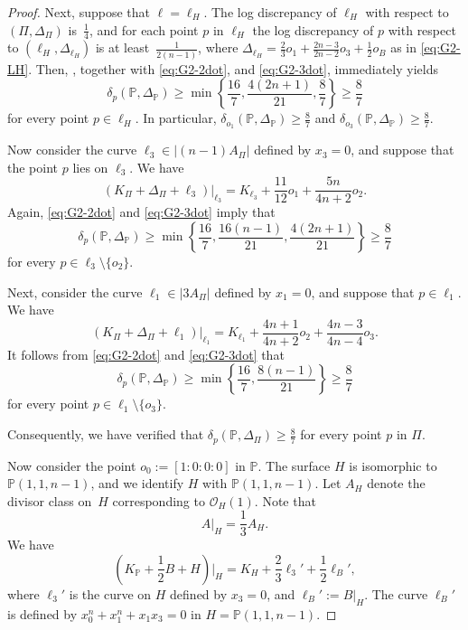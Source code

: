 \documentclass[10pt,a4paper]{amsart}
\begin{document}
\begin{proof}
Next, suppose that $\ell=\ell_H$. The log discrepancy of $\ell_H$ with respect to $(\Pi,\Delta_\Pi)$ is~$\frac{1}{4}$, and for each point $p$ in $\ell_H$ the log 
discrepancy of $p$ with respect to $(\ell_H,\Delta_{\ell_H})$ is at least~$\frac{1}{2(n-1)}$, where $\Delta_{\ell_H}=\frac{2}{3}o_1
+\frac{2n-3}{2n-2}o_3
+\frac{1}{2}o_B$ as in \eqref{eq:G2-LH}.
Then, \cite[Corollary~4.8]{Fu23}, together with \eqref{eq:G2-2dot}, and \eqref{eq:G2-3dot}, immediately yields
\[
\delta_{p}\left(\mathbb{P},\Delta_\mathbb{P}\right)
\ge
\min\left\{
\frac{16}{7},
\frac{4(2n+1)}{21},
\frac{8}{7}
\right\}
\ge
\frac{8}{7}
\]
for every point $p\in\ell_H$. In particular,  $\delta_{o_1}\left(\mathbb{P},\Delta_\mathbb{P}\right)\geq \frac{8}{7}$ and $ \delta_{o_3}\left(\mathbb{P},\Delta_\mathbb{P}\right)\geq \frac{8}{7}$.


Now consider the curve $\ell_3\in |(n-1)A_\Pi|$ defined by $x_3=0$, and suppose that the  point $p$ lies on $\ell_3$. We have
\[
\left(K_\Pi+\Delta_\Pi+\ell_3\right)\big|_{\ell_3}
=
K_{\ell_3}
+\frac{11}{12}o_1
+\frac{5n}{4n+2}o_2.
\]
Again, \eqref{eq:G2-2dot} and \eqref{eq:G2-3dot} imply that
\[
\delta_{p}\left(\mathbb{P},\Delta_\mathbb{P}\right)
\ge
\min\left\{
\frac{16}{7},
\frac{16(n-1)}{21},
\frac{4(2n+1)}{21}
\right\}
\ge
\frac{8}{7}
\]
for every $p\in\ell_3\setminus\{o_2\}$. 


Next, consider the curve $\ell_1\in |3A_\Pi|$ defined by $x_1=0$, and suppose that $p\in \ell_1$. We have
\[
\left(K_\Pi+\Delta_\Pi+\ell_1\right)\big|_{\ell_1}
=
K_{\ell_1}
+\frac{4n+1}{4n+2}o_2
+\frac{4n-3}{4n-4}o_3.
\]
It follows from \eqref{eq:G2-2dot} and \eqref{eq:G2-3dot} that
\[
\delta_{p}\left(\mathbb{P},\Delta_\mathbb{P}\right)
\ge
\min\left\{
\frac{16}{7},
\frac{8(n-1)}{21}
\right\}
\ge
\frac{8}{7}
\]
for every point $p\in \ell_1\setminus\{o_3\}$. 

Consequently,  we have verified that
$\delta_{p}\left(\mathbb{P}, \Delta_\Pi\right)\geq\frac{8}{7}$ for every point $p$ in $\Pi$.



Now consider the point $o_0:=[1:0:0:0]$ in $\mathbb{P}$. The surface $H$ is isomorphic to $\mathbb{P}(1,1,n-1)$, and we identify $H$ with $\mathbb{P}(1,1,n-1)$. Let $A_H$ denote the divisor class on~$H$ corresponding to $\mathcal{O}_H(1)$. Note that
\[
A|_H=\frac{1}{3}A_H.
\]
We have
\[
\left(K_\mathbb{P}+\frac{1}{2}B+H\right)\Big|_{H}
=K_H+\frac{2}{3}\ell_3'+\frac{1}{2}\ell_B',
\]
where $\ell_3'$ is the curve on $H$ defined by $x_3=0$, and $\ell_B':=B|_H$. The curve $\ell_B'$ is defined by
$
x_0^n+x_1^n+x_1x_3=0
$
in $H=\mathbb{P}(1,1,n-1)$.


\end{proof}
\end{document}

